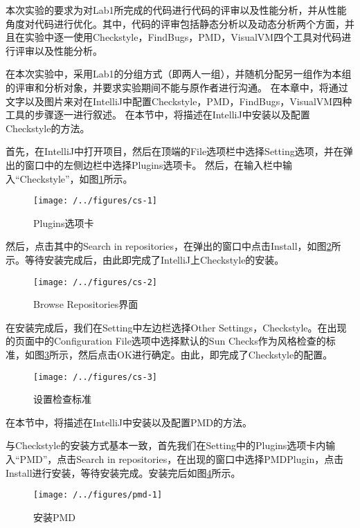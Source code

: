 \renewcommand{\textfraction}{0.05} 
本次实验的要求为对Lab1所完成的代码进行代码的评审以及性能分析，并从性能角度对代码进行优化。其中，代码的评审包括静态分析以及动态分析两个方面，并且在实验中逐一使用Checkstyle，FindBugs，PMD，VisualVM四个工具对代码进行评审以及性能分析。

在本次实验中，采用Lab1的分组方式（即两人一组），并随机分配另一组作为本组的评审和分析对象，并要求实验期间不能与原作者进行沟通。
在本章中，将通过文字以及图片来对在IntelliJ中配置Checkstyle，PMD，FindBugs，VisualVM四种工具的步骤逐一进行叙述。
在本节中，将描述在IntelliJ中安装以及配置Checkstyle的方法。

首先，在IntelliJ中打开项目，然后在顶端的File选项栏中选择Setting选项，并在弹出的窗口中的左侧边栏中选择Plugins选项卡。
然后，在输入栏中输入“Checkstyle”，如图\ref{fig:cs-1}所示。

\begin{figure}
\centering
\texttt{[image: /../figures/cs-1]}
\caption{Plugins选项卡}
\label{fig:cs-1}
\end{figure}

然后，点击其中的Search in repositories，在弹出的窗口中点击Install，如图\ref{fig:cs-2}所示。等待安装完成后，由此即完成了IntelliJ上Checkstyle的安装。

\begin{figure}
\centering
\texttt{[image: /../figures/cs-2]}
\caption{Browse Repositories界面}
\label{fig:cs-2}
\end{figure}

在安装完成后，我们在Setting中左边栏选择Other Settings，Checkstyle。在出现的页面中的Configuration File选项中选择默认的Sun Checks作为风格检查的标准，如图\ref{fig:cs-3}所示，然后点击OK进行确定。由此，即完成了Checkstyle的配置。
\begin{figure}
\centering
\texttt{[image: /../figures/cs-3]}
\caption{设置检查标准}
\label{fig:cs-3}
\end{figure}

在本节中，将描述在IntelliJ中安装以及配置PMD的方法。

与Checkstyle的安装方式基本一致，首先我们在Setting中的Plugins选项卡内输入“PMD”，点击Search in repositories，在出现的窗口中选择PMDPlugin，点击Install进行安装，等待安装完成。安装完后如图\ref{fig:pmd-1}所示。

\begin{figure}
\centering
\texttt{[image: /../figures/pmd-1]}
\caption{安装PMD}
\label{fig:pmd-1}
\end{figure}

